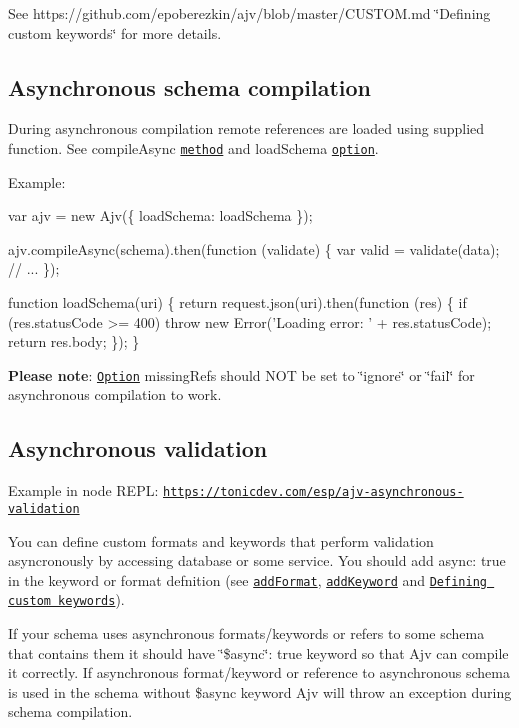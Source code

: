 See https\+://github.com/epoberezkin/ajv/blob/master/\+C\+U\+S\+T\+O\+M.\+md \char`\"{}\+Defining custom keywords\char`\"{} for more details.

\subsection*{Asynchronous schema compilation}

During asynchronous compilation remote references are loaded using supplied function. See {\ttfamily compile\+Async} \href{#api-compileAsync}{\tt method} and {\ttfamily load\+Schema} \href{#options}{\tt option}.

Example\+:


\begin{DoxyCode}
var ajv = new Ajv(\{ loadSchema: loadSchema \});

ajv.compileAsync(schema).then(function (validate) \{
  var valid = validate(data);
  // ...
\});

function loadSchema(uri) \{
  return request.json(uri).then(function (res) \{
    if (res.statusCode >= 400)
      throw new Error('Loading error: ' + res.statusCode);
    return res.body;
  \});
\}
\end{DoxyCode}


{\bfseries Please note}\+: \href{#options}{\tt Option} {\ttfamily missing\+Refs} should N\+OT be set to {\ttfamily \char`\"{}ignore\char`\"{}} or {\ttfamily \char`\"{}fail\char`\"{}} for asynchronous compilation to work.

\subsection*{Asynchronous validation}

Example in node R\+E\+PL\+: \href{https://tonicdev.com/esp/ajv-asynchronous-validation}{\tt https\+://tonicdev.\+com/esp/ajv-\/asynchronous-\/validation}

You can define custom formats and keywords that perform validation asyncronously by accessing database or some service. You should add {\ttfamily async\+: true} in the keyword or format defnition (see \href{#api-addformat}{\tt add\+Format}, \href{#api-addkeyword}{\tt add\+Keyword} and \href{#defining-custom-keywords}{\tt Defining custom keywords}).

If your schema uses asynchronous formats/keywords or refers to some schema that contains them it should have {\ttfamily \char`\"{}\$async\char`\"{}\+: true} keyword so that Ajv can compile it correctly. If asynchronous format/keyword or reference to asynchronous schema is used in the schema without {\ttfamily \$async} keyword Ajv will throw an exception during schema compilation.

